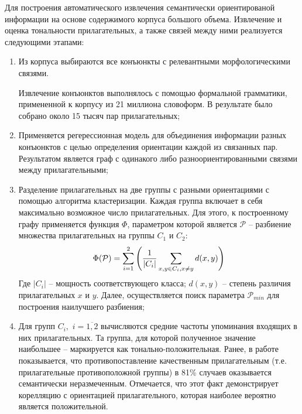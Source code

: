         Для построения автоматического извлечения семантически ориентированой
        информации на основе содержимого корпуса большого объема.
        Извлечение и оценка тональности прилагательных, а также связей между ними
        реализуется следующими этапами:
        \begin{enumerate}
            \item Из корпуса выбираются все конъюнкты с релевантными
                морфологическими связями.

                Извлечение конъюнктов выполнялось с помощью формальной
                грамматики, примененной к корпусу из 21 миллиона словоформ.
                В результате было собрано около 15 тысяч пар прилагательных;

            \item Применяется регерессионная модель для объединения информации
                разных конъюнктов с целью определения ориентации каждой из связанных пар.
                Результатом является граф с одинакого либо разноориентированными
                связями между прилагательными;
            \item Разделение прилагательных на две группы с разными ориентациями
                с помощью алгоритма кластеризации. Каждая группа включает в себя
                максимально возможное число прилагательных.
                Для этого, к построенному графу применяется функция $\Phi$,
                параметром которой является $\mathcal{P}$ -- разбиение множества
                прилагательных на группы $C_1$ и $C_2$:
                \begin{equation}
                    \Phi(\mathcal{P}) = \sum\limits_{i=1}^2 \Bigg( \dfrac{1}{|C_i|} \sum\limits_{x,y \in C_i, \\ x \neq y} d(x,y) \Bigg)
                \end{equation}
                Где $|C_i|$ -- мощность соответствующего класса; $d(x, y)$ --
                степень различия прилагательных $x$ и $y$.
                Далее, осуществляется поиск параметра $\mathcal{P}_{min}$ для
                построения наилучшего разбиения;

            \item Для групп $C_i, \hspace{4pt} i=\overline{1,2}$ вычисляются
                средние частоты упоминания входящих в них прилагательных.
                Та группа, для которой полученное значение наибольшее --
                маркируется как тонально-положительная.
                Ранее, в работе \cite{lexiconAdjectivesPrevious} показывается,
                что противопоставление качественным прилагательным (т.е.
                прилагательные противоположной группы) в 81\% случаев оказывается
                семантически неразмеченным. Отмечается, что этот факт демонстрирует
                корелляцию с ориентацией прилагательного, которая наиболее вероятно
                является положительной.
        \end{enumerate}

